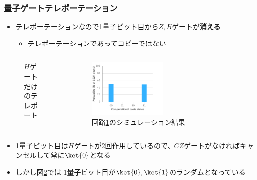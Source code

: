 \begin{frame}
  \frametitle{量子ゲートテレポーテーション}

  \begin{itemize}
    \item テレポーテーションなので1量子ビット目から$Z, H$ゲートが\textbf{消える}
    \begin{itemize}
      \item テレポーテーションであってコピーではない
    \end{itemize}
  \end{itemize}

  \begin{columns}
    \begin{column}{0.5\textwidth}
      \begin{figure}
        \caption{$H$ゲートだけのテレポート}
        \label{fig:h_gate_teleportation}
      \end{figure}
    \end{column}
    \begin{column}{0.5\textwidth}
      \begin{figure}
        \includegraphics[width=0.5\textwidth]{./img/h_gate_teleportation.pdf}
        \caption{回路\ref{fig:h_gate_teleportation}のシミュレーション結果}
        \label{fig:h_gate_teleportation_histogram}
      \end{figure}
    \end{column}
  \end{columns}

  \pause
  \begin{itemize}
    \item 1量子ビット目は$H$ゲートが2回作用しているので、$CZ$ゲートがなければキャンセルして常に$\ket{0}$となる

    \item しかし図\ref{fig:h_gate_teleportation_histogram}では
    1量子ビット目が$\ket{0},\ket{1}$のランダムとなっている
  \end{itemize}
\end{frame}

